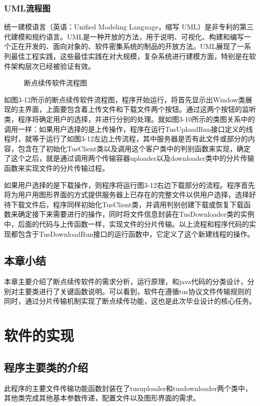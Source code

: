 \documentclass[bachelor]{thesis-uestc}
\begin{document}
\subsection{UML流程图}
统一建模语言（英语：Unified Modeling Language，缩写 UML）是非专利的第三代建模和规约语言。UML是一种开放的方法，用于说明、可视化、构建和编写一个正在开发的、面向对象的、软件密集系统的制品的开放方法。UML展现了一系列最佳工程实践，这些最佳实践在对大规模，复杂系统进行建模方面，特别是在软件架构层次已经被验证有效。
\begin{figure}[h]
\caption{断点续传软件流程图}
\end{figure}
\par 如图3-12所示的断点续传软件流程图，程序开始运行，将首先显示出Window类展现的主界面，上面要包含着上传文件和下载文件两个按钮。通过这两个按钮的监听类，程序将确定用户的选择，并进行分别的处理。就如图3-10所示的类图关系中的调用一样：如果用户选择的是上传操作，程序在运行TusUploadRun接口定义的线程时，就等于运行了如图3-12左边上传流程，其中服务器是否有此文件或部分的内容，包含在了初始化TusClient类以及调用这个客户类中的判别函数来实现，确定了这个之后，就是通过调用两个传输容器uploader以及downloader类中的分片传输函数来实现文件的分片传输过程。
\par 如果用户选择的是下载操作，则程序将运行图3-12右边下载部分的流程。程序首先将为用户用图形界面的方式提供服务器上已存在的完整文件以供用户选择，选择好待下载文件后，程序同样初始化TusClient类，并调用判别创建下载或恢复下载函数来确定接下来需要进行的操作，同时将文件信息封装在TusDownloader类的实例中，后面的代码与上传函数一样，实现文件的分片传输。以上流程和程序代码的实现都包含于TusDownloadRun接口的运行函数中，它定义了这个新建线程的操作。

\section{本章小结}
本章主要介绍了断点续传软件的需求分析，运行原理，和java代码的分类设计，分别对主要类进行了关键函数说明。可以看到，软件在遵循tus协议文件传输规则的同时，通过分片传输机制实现了断点续传功能，这也是此次毕业设计的核心任务。

\chapter{软件的实现}
\section{程序主要类的介绍}
此程序的主要文件传输功能函数封装在了tusuploader和tusdownloader两个类中，其他类完成其他基本参数传递，配置文件以及图形界面的需求。
\end{document}
